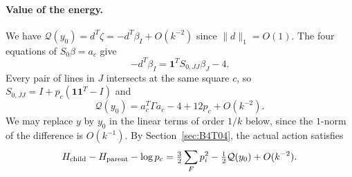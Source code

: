 \paragraph{Value of the energy.}
We have $\mathcal Q(y_0)=d^T\zeta=-d^T\beta_I+O(k^{-2})$ since $\|d\|_1=O(1)$. The four equations of
$S_0\beta=a_c$ give
\[
 -d^T\beta_I=\mathbf1^TS_{0,JJ}\beta_J-4.
\]
Every pair of lines in $J$ intersects at the same square $c$, so $S_{0,JJ}=I+p_c(\mathbf1\mathbf1^T-I)$ and
\[
 \boxed{\mathcal Q(y_0)=a_c^T\Gamma a_c-4+12p_c+O(k^{-2}).}
\]
We may replace $y$ by $y_0$ in the linear terms of order $1/k$ below, since the $1$-norm of the difference
is $O(k^{-1})$.
By Section~\ref{sec:B4T04}, the actual action satisfies
\[
 H_{\rm child}-H_{\rm parent}-\log p_c
 =\tfrac32\sum_Fp_i^2-\tfrac12\mathcal Q(y_0)+O(k^{-2}).
\]
